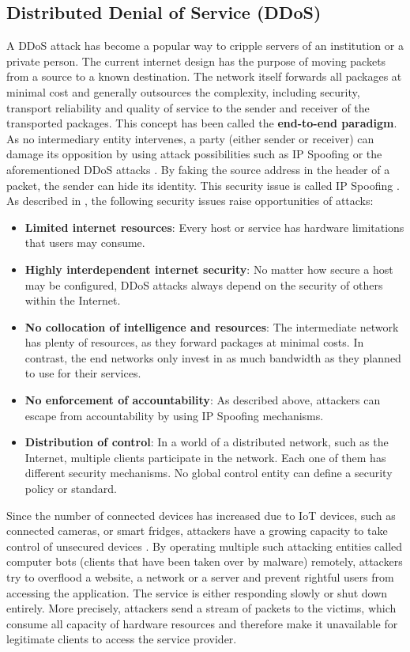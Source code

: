 \subsection{Distributed Denial of Service (DDoS)}
\label{subsec:03_ddos}

A DDoS attack has become a popular way to cripple servers of an institution or a private person. The current internet design has the purpose of moving packets from a source to a known destination. The network itself forwards all packages at minimal cost and generally outsources the complexity, including security, transport reliability and quality of service to the sender and receiver of the transported packages. This concept has been called the \textbf{end-to-end paradigm}. As no intermediary entity intervenes, a party (either sender or receiver) can damage its opposition by using attack possibilities such as IP Spoofing or the aforementioned DDoS attacks \cite{Mirkovic2004}. By faking the source address in the header of a packet, the sender can hide its identity. This security issue is called IP Spoofing \cite{Cloudflare2019}. As described in \cite{Mirkovic2004}, the following security issues raise opportunities of attacks:

\begin{itemize}
  \item \textbf{Limited internet resources}: Every host or service has hardware limitations that users may consume.
  \item \textbf{Highly interdependent internet security}: No matter how secure a host may be configured, DDoS attacks always depend on the security of others within the Internet.
  \item \textbf{No collocation of intelligence and resources}: The intermediate network has plenty of resources, as they forward packages at minimal costs.  In contrast, the end networks only invest in as much bandwidth as they planned to use for their services.
  \item \textbf{No enforcement of accountability}: As described above, attackers can escape from accountability by using IP Spoofing mechanisms.
  \item \textbf{Distribution of control}: In a world of a distributed network, such as the Internet, multiple clients participate in the network. Each one of them has different security mechanisms. No global control entity can define a security policy or standard.
\end{itemize}
Since the number of connected devices has increased due to IoT devices, such as connected cameras, or smart fridges, attackers have a growing capacity to take control of unsecured devices \cite{Rodrigues2017}. By operating multiple such attacking entities called computer bots (clients that have been taken over by malware) remotely, attackers try to overflood a website, a network or a server and prevent rightful users from accessing the application. The service is either responding slowly or shut down entirely. More precisely, attackers send a stream of packets to the victims, which consume all capacity of hardware resources and therefore make it unavailable for legitimate clients to access the service provider.

